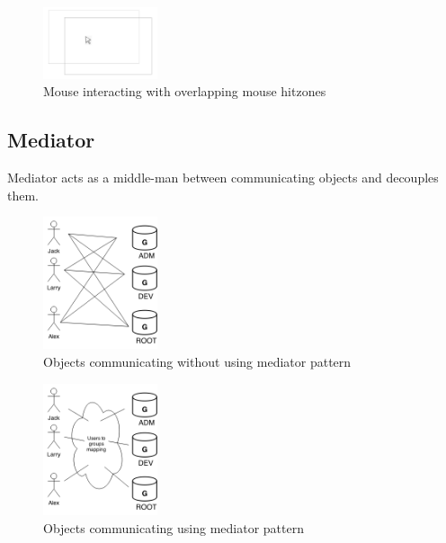 \begin{multicols}{2}
\begin{figure}[H]
	\centering
	\includegraphics[width=0.3\textwidth]{assets/mousehover}
	\caption{Mouse interacting with overlapping mouse hitzones}
	\label{fig:chainofcommand-mousezones}
\end{figure}

\subsection{Mediator}\label{ssection:mediator}


Mediator acts as a middle-man between communicating objects and decouples them\cite{sm-mediator}.

\begin{figure}[H]
	\centering
	\includegraphics[width=0.3\textwidth]{assets/mediator_before}
	\caption{Objects communicating without using mediator pattern}
	\label{fig:mediator-before}
\end{figure}

\begin{figure}[H]
	\centering
	\includegraphics[width=0.3\textwidth]{assets/mediator_after}
	\caption{Objects communicating using mediator pattern}
	\label{fig:mediator-after}
\end{figure}


\end{multicols}
